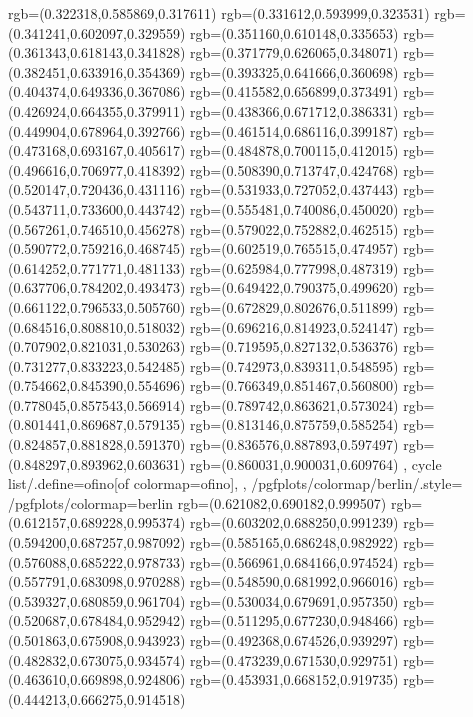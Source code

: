 {{{			rgb=(0.322318,0.585869,0.317611)
			rgb=(0.331612,0.593999,0.323531)
			rgb=(0.341241,0.602097,0.329559)
			rgb=(0.351160,0.610148,0.335653)
			rgb=(0.361343,0.618143,0.341828)
			rgb=(0.371779,0.626065,0.348071)
			rgb=(0.382451,0.633916,0.354369)
			rgb=(0.393325,0.641666,0.360698)
			rgb=(0.404374,0.649336,0.367086)
			rgb=(0.415582,0.656899,0.373491)
			rgb=(0.426924,0.664355,0.379911)
			rgb=(0.438366,0.671712,0.386331)
			rgb=(0.449904,0.678964,0.392766)
			rgb=(0.461514,0.686116,0.399187)
			rgb=(0.473168,0.693167,0.405617)
			rgb=(0.484878,0.700115,0.412015)
			rgb=(0.496616,0.706977,0.418392)
			rgb=(0.508390,0.713747,0.424768)
			rgb=(0.520147,0.720436,0.431116)
			rgb=(0.531933,0.727052,0.437443)
			rgb=(0.543711,0.733600,0.443742)
			rgb=(0.555481,0.740086,0.450020)
			rgb=(0.567261,0.746510,0.456278)
			rgb=(0.579022,0.752882,0.462515)
			rgb=(0.590772,0.759216,0.468745)
			rgb=(0.602519,0.765515,0.474957)
			rgb=(0.614252,0.771771,0.481133)
			rgb=(0.625984,0.777998,0.487319)
			rgb=(0.637706,0.784202,0.493473)
			rgb=(0.649422,0.790375,0.499620)
			rgb=(0.661122,0.796533,0.505760)
			rgb=(0.672829,0.802676,0.511899)
			rgb=(0.684516,0.808810,0.518032)
			rgb=(0.696216,0.814923,0.524147)
			rgb=(0.707902,0.821031,0.530263)
			rgb=(0.719595,0.827132,0.536376)
			rgb=(0.731277,0.833223,0.542485)
			rgb=(0.742973,0.839311,0.548595)
			rgb=(0.754662,0.845390,0.554696)
			rgb=(0.766349,0.851467,0.560800)
			rgb=(0.778045,0.857543,0.566914)
			rgb=(0.789742,0.863621,0.573024)
			rgb=(0.801441,0.869687,0.579135)
			rgb=(0.813146,0.875759,0.585254)
			rgb=(0.824857,0.881828,0.591370)
			rgb=(0.836576,0.887893,0.597497)
			rgb=(0.848297,0.893962,0.603631)
			rgb=(0.860031,0.900031,0.609764)
		},
	cycle list/.define={ofino}{[of colormap=ofino]},
	},
	/pgfplots/colormap/berlin/.style={
		/pgfplots/colormap={berlin}{%
			rgb=(0.621082,0.690182,0.999507)
			rgb=(0.612157,0.689228,0.995374)
			rgb=(0.603202,0.688250,0.991239)
			rgb=(0.594200,0.687257,0.987092)
			rgb=(0.585165,0.686248,0.982922)
			rgb=(0.576088,0.685222,0.978733)
			rgb=(0.566961,0.684166,0.974524)
			rgb=(0.557791,0.683098,0.970288)
			rgb=(0.548590,0.681992,0.966016)
			rgb=(0.539327,0.680859,0.961704)
			rgb=(0.530034,0.679691,0.957350)
			rgb=(0.520687,0.678484,0.952942)
			rgb=(0.511295,0.677230,0.948466)
			rgb=(0.501863,0.675908,0.943923)
			rgb=(0.492368,0.674526,0.939297)
			rgb=(0.482832,0.673075,0.934574)
			rgb=(0.473239,0.671530,0.929751)
			rgb=(0.463610,0.669898,0.924806)
			rgb=(0.453931,0.668152,0.919735)
			rgb=(0.444213,0.666275,0.914518)
}}}
